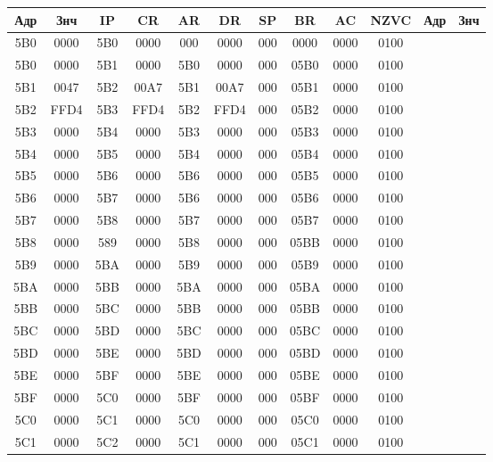\begin{center}
\begin{tabular}{|c|c|c|c|c|c|c|c|c|c|c|c|}
\hline
\textbf{Адр} & \textbf{Знч} & \textbf{IP} & \textbf{CR} & \textbf{AR} & \textbf{DR} & \textbf{SP} & \textbf{BR} & \textbf{AC} & \textbf{NZVC} & \textbf{Адр} & \textbf{Знч} \\ \hline
5B0 & 0000 & 5B0 & 0000 & 000 & 0000 & 000 & 0000 & 0000 & 0100 &  &  \\ \hline
5B0 & 0000 & 5B1 & 0000 & 5B0 & 0000 & 000 & 05B0 & 0000 & 0100 &  &  \\ \hline
5B1 & 0047 & 5B2 & 00A7 & 5B1 & 00A7 & 000 & 05B1 & 0000 & 0100 &  &  \\ \hline
5B2 & FFD4 & 5B3 & FFD4 & 5B2 & FFD4 & 000 & 05B2 & 0000 & 0100 &  &  \\ \hline
5B3 & 0000 & 5B4 & 0000 & 5B3 & 0000 & 000 & 05B3 & 0000 & 0100 &  &  \\ \hline
5B4 & 0000 & 5B5 & 0000 & 5B4 & 0000 & 000 & 05B4 & 0000 & 0100 &  &  \\ \hline
5B5 & 0000 & 5B6 & 0000 & 5B6 & 0000 & 000 & 05B5 & 0000 & 0100 &  &  \\ \hline
5B6 & 0000 & 5B7 & 0000 & 5B6 & 0000 & 000 & 05B6 & 0000 & 0100 &  &  \\ \hline
5B7 & 0000 & 5B8 & 0000 & 5B7 & 0000 & 000 & 05B7 & 0000 & 0100 &  &  \\ \hline
5B8 & 0000 & 589 & 0000 & 5B8 & 0000 & 000 & 05BB & 0000 & 0100 &  &  \\ \hline
5B9 & 0000 & 5BA & 0000 & 5B9 & 0000 & 000 & 05B9 & 0000 & 0100 &  &  \\ \hline
5BA & 0000 & 5BB & 0000 & 5BA & 0000 & 000 & 05BA & 0000 & 0100 &  &  \\ \hline
5BB & 0000 & 5BC & 0000 & 5BB & 0000 & 000 & 05BB & 0000 & 0100 &  &  \\ \hline
5BC & 0000 & 5BD & 0000 & 5BC & 0000 & 000 & 05BC & 0000 & 0100 &  &  \\ \hline
5BD & 0000 & 5BE & 0000 & 5BD & 0000 & 000 & 05BD & 0000 & 0100 &  &  \\ \hline
5BE & 0000 & 5BF & 0000 & 5BE & 0000 & 000 & 05BE & 0000 & 0100 &  &  \\ \hline
5BF & 0000 & 5C0 & 0000 & 5BF & 0000 & 000 & 05BF & 0000 & 0100 &  &  \\ \hline
5C0 & 0000 & 5C1 & 0000 & 5C0 & 0000 & 000 & 05C0 & 0000 & 0100 &  &  \\ \hline
5C1 & 0000 & 5C2 & 0000 & 5C1 & 0000 & 000 & 05C1 & 0000 & 0100 &  &  \\ \hline

\end{tabular}
\end{center}

